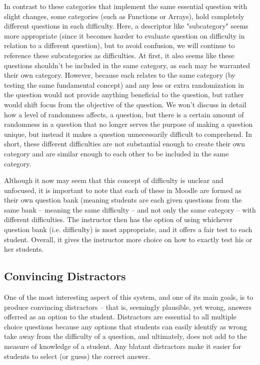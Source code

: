 \documentclass{article}
\begin{document}
In contrast to these categories that implement the same essential question with slight changes, some categories (such as Functions
or Arrays), hold completely different questions in each difficulty. Here, a descriptor like "subcategory" seems more appropriate
(since it becomes harder to evaluate question on difficulty in relation to a different question), but
to avoid confusion, we will continue to reference these subcategories as difficulties. At first, it also seems like these questions shouldn't
be included in the same category, as each may be warranted their own category. However, because each relates to the same category
(by testing the same fundamental concept) and any less or extra randomization in the question would not provide anything beneficial to
the question, but rather would shift focus from the objective of the question. We won't discuss in detail how a level of randomness affects,
a question, but there is a certain amount of randomness in a question that no longer serves the purpose of making a question unique,
but instead it makes a question unnecessarily difficult to comprehend. In short, these different difficulties are not substantial enough to
create their own category and are similar enough to each other to be included in the same category.

Although it now may seem that this concept of difficulty is unclear and unfocused, it is important to note that each of these in Moodle are
formed as their own question bank (meaning students are each given questions from the same bank -- meaning the same difficulty -- and not only
the same category -- with different difficulties. The instructor then has the option of using whichever question bank (i.e. difficulty) is most appropriate,
and it offers a fair test to each student. Overall, it gives the instructor more choice on how to exactly test his or her students.

\subsection{Convincing Distractors}

One of the most interesting aspect of this system, and one of its main goals, is to produce convincing distractors -- that is, seemingly plausible, yet wrong, answers offerred as an option to the student. Distractors
are essential to all multiple choice questions because any options that students can easily identify as wrong take away from the difficulty of a question, and ultimately, does not add to the measure of knowledge of a student. Any blatant distractors make it easier for students to select (or guess) the correct answer. 
\end{document}
